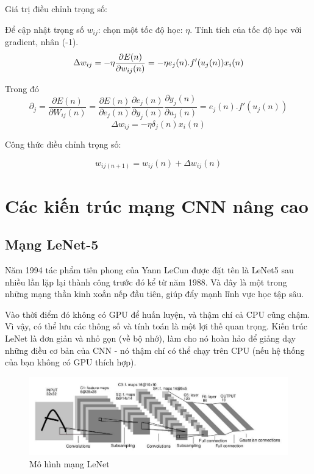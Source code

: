 Giá trị điều chỉnh trọng số:

Để cập nhật trọng số $w_{ij}$: chọn một tốc độ học: $\eta$. Tính tích của tốc độ học với gradient, nhân (-1).
\begin{equation}
\Delta w_{ij} = -\eta \frac{\partial E(n)}{\partial w_{ij}(n)}=-\eta e_j(n).f'(u_j(n))x_i(n)\\
\end{equation}

Trong đó
\begin{equation}
\partial _j = \frac{\partial E(n)}{\partial W_{ij}(n)} =  \frac{\partial E(n)}{\partial e_j(n)}\frac{\partial e_j(n)}{\partial y_j(n)}\frac{\partial y_j(n)}{\partial u_j(n)}=e_j(n).f'(u_j(n))
\end{equation}
\begin{equation}
\Delta w_{ij} = -\eta \delta _j(n)x_i(n)
\end{equation}

Công thức điều chỉnh trọng số:

\begin{equation}
w_{ij(n+1)} =w_{ij}(n)+ \Delta w_{ij}(n) 
\end{equation}

\section{Các kiến trúc mạng CNN nâng cao}
\subsection{Mạng LeNet-5}

Năm 1994 tác phẩm tiên phong của Yann LeCun được đặt tên là LeNet5 sau nhiều lần lặp lại thành công trước đó kể từ năm 1988. Và đây là một trong những mạng thần kinh xoắn nếp đầu tiên, giúp đẩy mạnh lĩnh vực học tập sâu.

Vào thời điểm đó không có GPU để huấn luyện, và thậm chí cả CPU cũng chậm. Vì vậy, có thể lưu các thông số và tính toán là một lợi thế quan trọng. Kiến trúc LeNet là  đơn giản và  nhỏ gọn (về bộ nhớ), làm cho nó  hoàn hảo để giảng dạy những điều cơ bản của CNN - nó thậm chí có thể chạy trên CPU (nếu hệ thống của bạn không có GPU thích hợp).

\begin{center}
    \begin{figure}[h!]
    \begin{center}
     \includegraphics[scale=0.5]{img/lenet.png}
    \end{center}
    \caption{Mô hình mạng LeNet \cite{lenet5}}
    \label{refhinh10}
    \end{figure}
\end{center}

